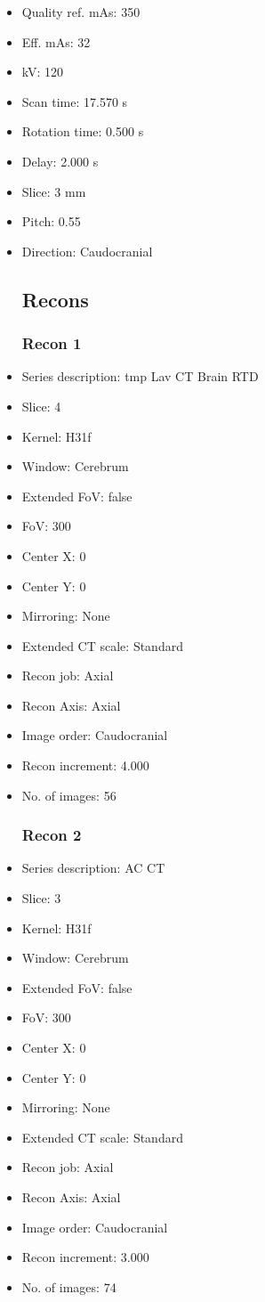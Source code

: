 \documentclass[12pt]{article}
\begin{document}
\begin{itemize}
\subsection{Scan}
\item Quality ref. mAs: 350\item Eff. mAs: 32\item kV: 120\item Scan time: 17.570 s\item Rotation time: 0.500 s\item Delay: 2.000 s\item Slice: 3 mm\item Pitch: 0.55\item Direction: Caudocranial\subsection{Recons}

\subsubsection{Recon 1}
\item Series description: tmp Lav CT Brain RTD
\item Slice: 4
\item Kernel: H31f
\item Window: Cerebrum
\item Extended FoV: false
\item FoV: 300
\item Center X: 0
\item Center Y: 0
\item Mirroring: None
\item Extended CT scale: Standard
\item Recon job: Axial
\item Recon Axis: Axial
\item Image order: Caudocranial
\item Recon increment: 4.000
\item No. of images: 56
\subsubsection{Recon 2}
\item Series description: AC CT
\item Slice: 3
\item Kernel: H31f
\item Window: Cerebrum
\item Extended FoV: false
\item FoV: 300
\item Center X: 0
\item Center Y: 0
\item Mirroring: None
\item Extended CT scale: Standard
\item Recon job: Axial
\item Recon Axis: Axial
\item Image order: Caudocranial
\item Recon increment: 3.000
\item No. of images: 74

\end{itemize}
\end{document}
